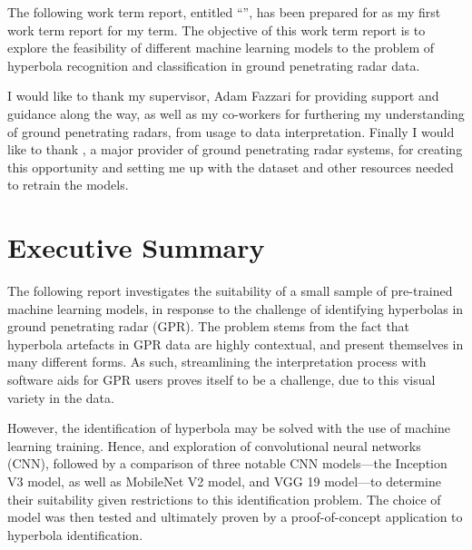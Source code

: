 \documentclass[se,blockletter]{uw-wkrpt}
\begin{document}
\newcommand{\thecompany}{Sensors \& Software Inc.}

\frontmatter

\begin{letter}

The following work term report, entitled ``\thetitle'', has been prepared for \theemployer{} as my first work term report for my \theterm{} term. The objective of this work term report is to explore the feasibility of different machine learning models to the problem of hyperbola recognition and classification in ground penetrating radar data. 

I would like to thank my supervisor, Adam Fazzari for providing support and guidance along the way, as well as my co-workers for furthering my understanding of ground penetrating radars, from usage to data interpretation. Finally I would like to thank \theemployer{}, a major provider of ground penetrating radar systems, for creating this opportunity and setting me up with the dataset and other resources needed to retrain the models. 

\end{letter}

\section{Executive Summary}
The following report investigates the suitability of a small sample of pre-trained machine learning models, in response to the challenge of identifying hyperbolas in ground penetrating radar (GPR). The problem stems from the fact that hyperbola artefacts in GPR data are highly contextual, and present themselves in many different forms. As such, streamlining the interpretation process with software aids for GPR users proves itself to be a challenge, due to this visual variety in the data.

However, the identification of hyperbola may be solved with the use of machine learning training. Hence, and exploration of convolutional neural networks (CNN), followed by a comparison of three notable CNN models---the Inception V3 model, as well as MobileNet V2 model, and VGG 19 model---to determine their suitability given restrictions to this identification problem. The choice of model was then tested and ultimately proven by a proof-of-concept application to hyperbola identification.
\end{document}
